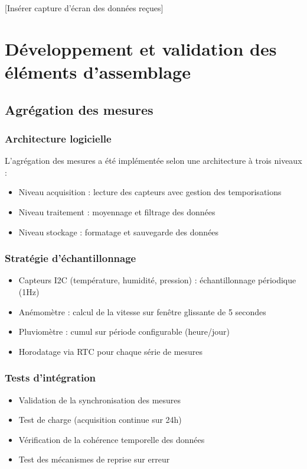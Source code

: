 \documentclass[12pt]{article}
\begin{document}
[Insérer capture d'écran des données reçues]

\section{Développement et validation des éléments d'assemblage}

\subsection{Agrégation des mesures}
\subsubsection{Architecture logicielle}
L'agrégation des mesures a été implémentée selon une architecture à trois niveaux :
\begin{itemize}
    \item Niveau acquisition : lecture des capteurs avec gestion des temporisations
    \item Niveau traitement : moyennage et filtrage des données
    \item Niveau stockage : formatage et sauvegarde des données
\end{itemize}

\subsubsection{Stratégie d'échantillonnage}
\begin{itemize}
    \item Capteurs I2C (température, humidité, pression) : échantillonnage périodique (1Hz)
    \item Anémomètre : calcul de la vitesse sur fenêtre glissante de 5 secondes
    \item Pluviomètre : cumul sur période configurable (heure/jour)
    \item Horodatage via RTC pour chaque série de mesures
\end{itemize}

\subsubsection{Tests d'intégration}
\begin{itemize}
    \item Validation de la synchronisation des mesures
    \item Test de charge (acquisition continue sur 24h)
    \item Vérification de la cohérence temporelle des données
    \item Test des mécanismes de reprise sur erreur
\end{itemize}
\end{document}

